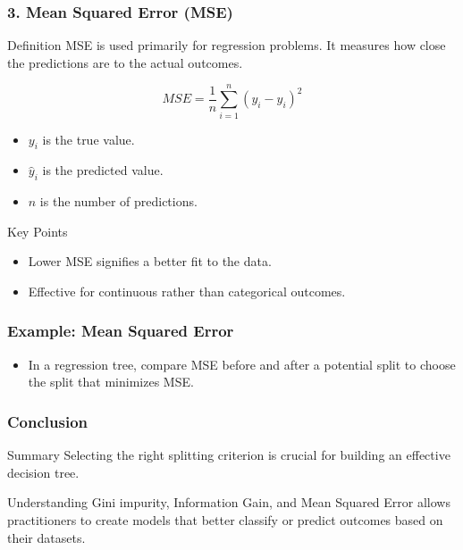 \documentclass[aspectratio=169]{beamer}
\begin{document}
\begin{frame}[fragile]
    \frametitle{3. Mean Squared Error (MSE)}

    \begin{block}{Definition}
        MSE is used primarily for regression problems. It measures how close the predictions are to the actual outcomes.
    \end{block}

    \begin{equation}
        MSE = \frac{1}{n} \sum_{i=1}^{n} (y_i - \hat{y}_i)^2
    \end{equation}

    \begin{itemize}
        \item \( y_i \) is the true value.
        \item \( \hat{y}_i \) is the predicted value.
        \item \( n \) is the number of predictions.
    \end{itemize}

    \begin{block}{Key Points}
        \begin{itemize}
            \item Lower MSE signifies a better fit to the data.
            \item Effective for continuous rather than categorical outcomes.
        \end{itemize}
    \end{block}
    
\end{frame}

\begin{frame}[fragile]
    \frametitle{Example: Mean Squared Error}

    \begin{itemize}
        \item In a regression tree, compare MSE before and after a potential split to choose the split that minimizes MSE.
    \end{itemize}

\end{frame}

\begin{frame}[fragile]
    \frametitle{Conclusion}

    \begin{block}{Summary}
        Selecting the right splitting criterion is crucial for building an effective decision tree. 
    \end{block}
    
    Understanding Gini impurity, Information Gain, and Mean Squared Error allows practitioners to create models that better classify or predict outcomes based on their datasets.

\end{frame}
\end{document}
